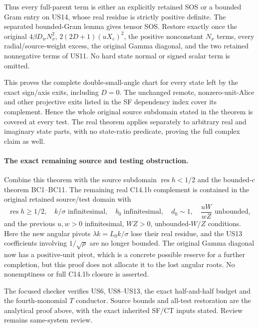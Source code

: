 Thus every full-parent term is either an explicitly retained SOS
or a bounded Gram entry on US14, whose real residue is strictly
positive definite. The separated bounded-Gram lemma gives tensor
SOS. Restore exactly once the original $4\beta D_wN_x^2$,
$2(2D+1)(uX_e)^2$, the positive nonconstant $N_x$ terms, every
radial/source-weight excess, the original Gamma diagonal, and the
two retained nonnegative terms of US11. No hard state normal or
signed scalar term is omitted.

This proves the complete double-small-angle chart for every state
left by the exact sign/axis exits, including $D=0$. The unchanged
remote, nonzero-unit-Alice and other projective exits listed in the
SF dependency index cover its complement. Hence the whole original
source subdomain stated in the theorem is covered at every test.
The real theorem applies separately to arbitrary real and imaginary
state parts, with no state-ratio predicate, proving the full complex
claim as well.

\paragraph{The exact remaining source and testing obstruction.}
Combine this theorem with the source subdomain
$\operatorname{res}h<1/2$ and the bounded-$c$ theorem BC1--BC11.
The remaining real C14.1b complement is contained in the original
retained source/test domain with
\[
 \operatorname{res}h\ge1/2,\quad k/\sigma\text{ infinitesimal},
 \quad b_0\text{ infinitesimal},\quad d_0\sim1,
 \quad \frac{uW}{wZ}\text{ unbounded},
 \tag{US15}
\]
and the previous $u,w>0$ infinitesimal, $WZ>0$, unbounded-$W/Z$
conditions. Here the new angular pivots $\lambda k=L_0k/\sigma$
lose their real residue, and the US13 coefficients involving
$1/\sqrt\rho$ are no longer bounded. The original Gamma diagonal
now has a positive-unit pivot, which is a concrete possible reserve
for a further completion, but this proof does not allocate it to
the lost angular roots. No nonemptiness or full C14.1b closure is
asserted.

The focused checker verifies US6, US8--US13, the exact half-and-half
budget and the fourth-monomial $T$ conductor. Source bounds and
all-test restoration are the analytical proof above, with the exact
inherited SF/CT inputs stated. Review remains same-system review.
